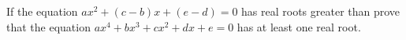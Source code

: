 If the equation $ ax^2+(c-b)x+(e-d)=0$ has real roots greater than  prove that the equation $ ax^4+bx^3+cx^2+dx+e=0$ has at least one real root.